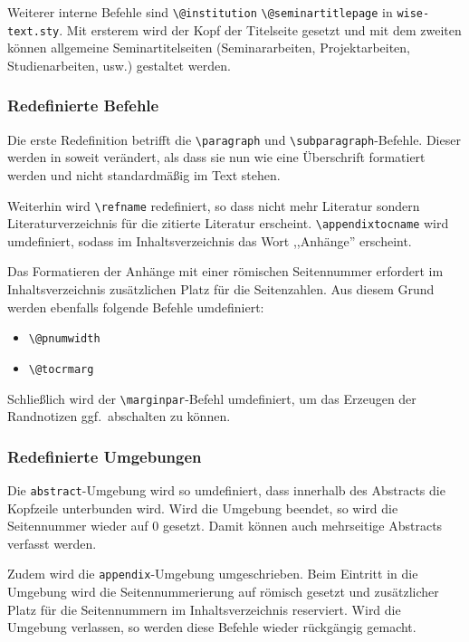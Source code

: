 \documentclass[english, trackchanges, hyperref, ngerman ,pdf, mp, mppdf]{wise}
\newcommand\code[1]{\texttt{#1}}
\newcommand\command[1]{\code{\textbackslash{}#1}}
\begin{document}
Weiterer interne Befehle sind \command{@institution}
\command{@seminartitlepage} in \code{wise-\linebreak text.sty}.
Mit ersterem wird der Kopf der Titelseite gesetzt und mit dem zweiten
können allgemeine Seminartitelseiten (Seminararbeiten, Projektarbeiten,
Studienarbeiten, usw.) gestaltet werden.


\subsubsection{Redefinierte Befehle}\label{sec:redefinierte_befehle}
Die erste Redefinition betrifft die \command{paragraph} und
\command{subparagraph}-Befehle.  Dieser werden in soweit
verändert, als dass sie nun wie eine Überschrift formatiert werden und
nicht standardmäßig im Text stehen.

Weiterhin wird \command{refname} redefiniert, so dass
nicht mehr Literatur sondern Literaturverzeichnis für die zitierte
Literatur erscheint. \command{appendixtocname} wird
umdefiniert, sodass im Inhaltsverzeichnis das Wort ,,Anhänge'' erscheint.

Das Formatieren der Anhänge mit einer römischen Seitennummer erfordert
im Inhaltsverzeichnis zusätzlichen Platz für die Seitenzahlen. Aus
diesem Grund werden ebenfalls folgende Befehle umdefiniert:

\begin{itemize}
\item \command{@pnumwidth}
\item \command{@tocrmarg}
\end{itemize}
Schließlich wird der \command{marginpar}-Befehl umdefiniert,
um das Erzeugen der Randnotizen ggf.\ abschalten zu können.


\subsubsection{Redefinierte Umgebungen}

Die \code{abstract}-Umgebung wird so umdefiniert, dass innerhalb
des Abstracts die Kopfzeile unterbunden wird. Wird die Umgebung beendet,
so wird die Seitennummer wieder auf 0 gesetzt. Damit können auch mehrseitige
Abstracts verfasst werden.

Zudem wird die \code{appendix}-Umgebung umgeschrieben. Beim Eintritt
in die Umgebung wird die Seitennummerierung auf römisch gesetzt und
zusätzlicher Platz für die Seitennummern im Inhaltsverzeichnis reserviert.
Wird die Umgebung verlassen, so werden diese Befehle wieder rückgängig
gemacht.
\end{document}
